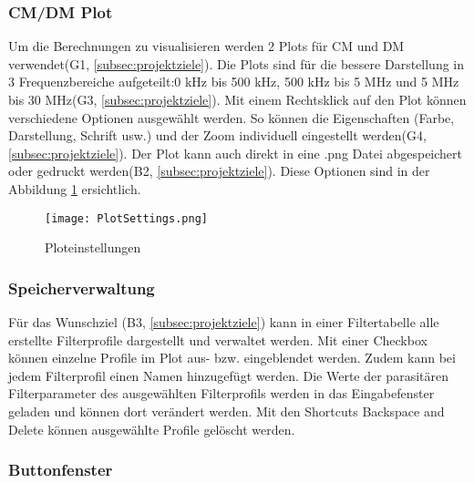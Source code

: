 \subsubsection{CM/DM Plot} \label{subsubsec:CM_DMplot}

Um die Berechnungen zu visualisieren werden 2 Plots für CM und DM verwendet(G1,  \ref{subsec:projektziele}). Die Plots sind für die bessere Darstellung in 3 Frequenzbereiche aufgeteilt:0 kHz bis 500 kHz, 500 kHz bis 5 MHz und 5 MHz bis 30 MHz(G3,  \ref{subsec:projektziele}). Mit einem Rechtsklick auf den Plot können verschiedene Optionen ausgewählt werden. So können die Eigenschaften (Farbe, Darstellung, Schrift usw.) und der Zoom individuell eingestellt werden(G4,  \ref{subsec:projektziele}). Der Plot kann auch direkt in eine .png Datei abgespeichert oder gedruckt werden(B2,  \ref{subsec:projektziele}). Diese Optionen sind in der Abbildung \ref{fig:PlotSettings} ersichtlich.

\begin{figure}[H]
	\centering
	\texttt{[image: PlotSettings.png]}
	\caption{Ploteinstellungen}
	\label{fig:PlotSettings}
\end{figure} 


\subsubsection{Speicherverwaltung} \label{subsubsec:speicherverwaltung}

Für das Wunschziel (B3,  \ref{subsec:projektziele}) kann in einer Filtertabelle alle erstellte Filterprofile dargestellt und verwaltet werden.  Mit einer Checkbox können einzelne Profile im Plot aus- bzw. eingeblendet werden. Zudem kann bei jedem Filterprofil einen Namen hinzugefügt werden. Die Werte der parasitären Filterparameter des ausgewählten Filterprofils werden in das Eingabefenster geladen und können dort verändert werden. Mit den Shortcuts Backspace and Delete können ausgewählte Profile gelöscht werden.

\subsubsection{Buttonfenster} \label{subsubsec:buttonfenster}

